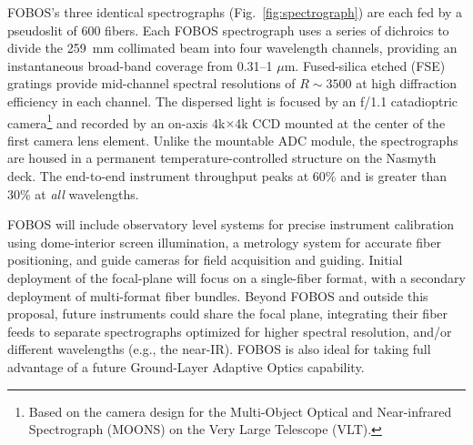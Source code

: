 FOBOS's three identical spectrographs (Fig.~\ref{fig:spectrograph})
are each fed by a pseudoslit of 600 fibers. Each FOBOS spectrograph
uses a series of dichroics to divide the 259~mm collimated beam into
four wavelength channels, providing an instantaneous broad-band
coverage from 0.31--1 $\mu$m. Fused-silica etched (FSE) gratings
provide mid-channel spectral resolutions of $R\sim3500$ at high
diffraction efficiency in each channel. The dispersed light is
focused by an f/1.1 catadioptric camera\footnote{Based on the camera
design for the Multi-Object Optical and Near-infrared Spectrograph
(MOONS) on the Very Large Telescope (VLT).} and recorded by an
on-axis 4k$\times$4k CCD mounted at the center of the first camera
lens element. Unlike the mountable ADC module, the spectrographs are
housed in a permanent temperature-controlled structure on the Nasmyth
deck. The end-to-end instrument throughput peaks at 60\% and is
greater than 30\% at {\it all} wavelengths.

FOBOS will include observatory level systems for precise instrument
calibration using dome-interior screen illumination, a metrology system
for accurate fiber positioning, and guide cameras for field acquisition
and guiding.  Initial deployment of the focal-plane will focus on a
single-fiber format, with a secondary deployment of multi-format fiber
bundles.  Beyond FOBOS and outside this proposal, future instruments could share the focal plane, integrating their
fiber feeds to separate spectrographs optimized for higher spectral resolution, and/or
different wavelengths (e.g., the near-IR).  FOBOS is also ideal for taking full advantage of a future
Ground-Layer Adaptive Optics capability.

